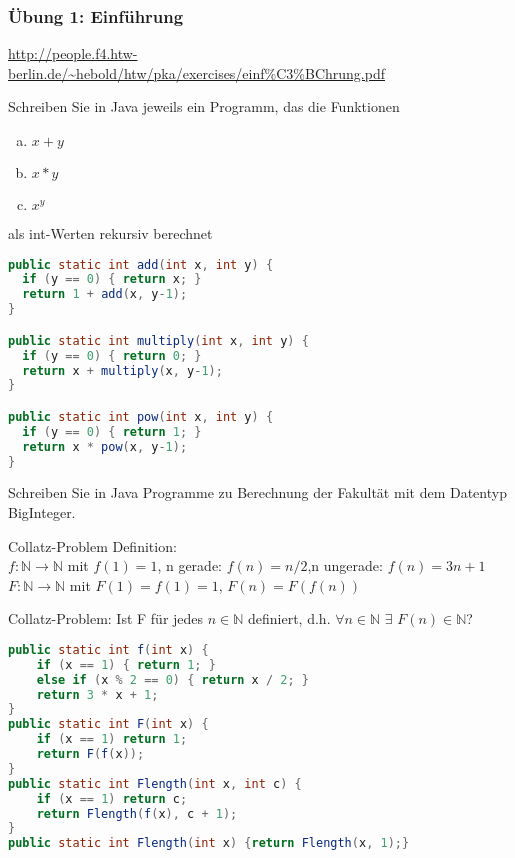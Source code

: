\begin{card}
	\frametitle{Übung 1: Einführung}
	\url{http://people.f4.htw-berlin.de/~hebold/htw/pka/exercises/einf\%C3\%BChrung.pdf}
\end{card}

\begin{card}
	Schreiben Sie in Java jeweils ein Programm, das die Funktionen
	\begin{enumerate}[a)]
	\item $x+y$
	\item $x*y$
	\item $x^y$
	\end{enumerate}
	als int-Werten rekursiv berechnet
	\hr
	\begin{lstlisting}[language=Java]
public static int add(int x, int y) {
  if (y == 0) { return x; }
  return 1 + add(x, y-1);
}

public static int multiply(int x, int y) {
  if (y == 0) { return 0; }
  return x + multiply(x, y-1);
}

public static int pow(int x, int y) {
  if (y == 0) { return 1; }
  return x * pow(x, y-1);
}
	\end{lstlisting}	
\end{card}

\begin{card}
	Schreiben Sie in Java Programme zu Berechnung der Fakultät mit dem Datentyp BigInteger.
\end{card}

\begin{card}
	Collatz-Problem Definition:\\
	$f: \mathbb{N} \rightarrow \mathbb{N}$ mit 
	$f(1) = 1$, n gerade: $f(n) = n / 2$,n ungerade: $f(n) = 3n + 1$\\
	$F: \mathbb{N} \rightarrow \mathbb{N}$ mit $F(1) = f(1)  = 1$, $F(n) = F(f(n))$
	
	Collatz-Problem: Ist F für jedes $n \in \mathbb{N}$  definiert, d.h. $\forall n \in \mathbb{N}$ $\exists$ $F(n) \in \mathbb{N}$?
	\hr
	\begin{lstlisting}[language=Java]
public static int f(int x) { 
    if (x == 1) { return 1; } 
    else if (x % 2 == 0) { return x / 2; }
    return 3 * x + 1;
} 
public static int F(int x) { 
    if (x == 1) return 1; 
    return F(f(x)); 
}
public static int Flength(int x, int c) { 
    if (x == 1) return c; 
    return Flength(f(x), c + 1); 
}
public static int Flength(int x) {return Flength(x, 1);}
	\end{lstlisting}
\end{card}

